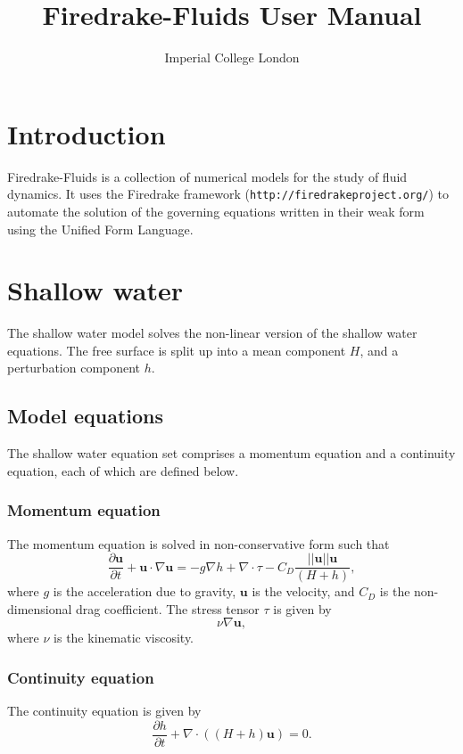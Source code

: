 \documentclass[a4paper,11pt]{report}
\title{Firedrake-Fluids User Manual}
\author{Imperial College London}
\begin{document}
\maketitle
\tableofcontents

\setlength{\parskip}{0.3cm}
\setlength{\parindent}{0cm}

\chapter{Introduction}
Firedrake-Fluids is a collection of numerical models for the study of fluid dynamics. It uses the Firedrake framework (\texttt{http://firedrakeproject.org/}) to automate the solution of the governing equations written in their weak form using the Unified Form Language.

\chapter{Shallow water}
The shallow water model solves the non-linear version of the shallow water equations. The free surface is split up into a mean component $H$, and a perturbation component $h$.

\section{Model equations}
The shallow water equation set comprises a momentum equation and a continuity equation, each of which are defined below.

\subsection{Momentum equation}
The momentum equation is solved in non-conservative form such that
\begin{equation}
   \frac{\partial \mathbf{u}}{\partial t} + \mathbf{u}\cdot\nabla\mathbf{u} = -g\nabla h + \nabla\cdot\tau - C_D\frac{||\mathbf{u}||\mathbf{u}}{(H + h)},
\end{equation}
where $g$ is the acceleration due to gravity, $\mathbf{u}$ is the velocity, and $C_D$ is the non-dimensional drag coefficient. The stress tensor $\tau$ is given by 
\begin{equation}
   \nu\nabla\mathbf{u},
\end{equation}
where $\nu$ is the kinematic viscosity.

\subsection{Continuity equation}
The continuity equation is given by
\begin{equation}
   \frac{\partial h}{\partial t} + \nabla\cdot\left(\left(H + h\right)\mathbf{u}\right) = 0.
\end{equation}
\end{document}
